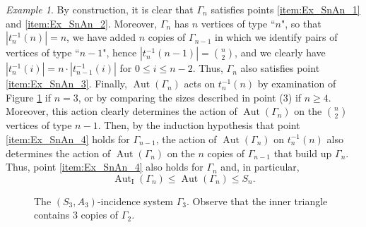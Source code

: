 \documentclass{amsart}
\theoremstyle{definition}
\theoremstyle{remark}
\newtheorem{example}[theorem]{Example}
\newcommand{\Aut}{\operatorname{Aut}}
\newcommand{\AutI}{\Aut_{\text{I}}}
\begin{document}
\begin{example}
By construction, it is clear that $\Gamma_n$ satisfies points \ref{item:Ex_SnAn_1} and  \ref{item:Ex_SnAn_2}. Moreover, $\Gamma_n$ has $n$ vertices of type ``$n$", so that $|t_n^{-1}(n)| = n$, we have added $n$ copies of $\Gamma_{n-1}$ in which we identify pairs of vertices of type ``$n-1$", hence $|t_n^{-1}(n-1)| = \binom{n}{2}$, and we clearly have $|t_n^{-1}(i)| = n \cdot |t_{n-1}^{-1}(i)|$ for $0\leq i \leq  n - 2$. Thus, $\Gamma_n$ also satisfies point \ref{item:Ex_SnAn_3}. Finally, $\Aut(\Gamma_n)$ acts on $t_n^{-1}(n)$ by examination of Figure \ref{fig:Gamma_3} if $n=3$, or by comparing the sizes described in point (3) if $n\geq 4$. Moreover, this action clearly determines the action of $\Aut(\Gamma_n)$ on the $\binom{n}{2}$ vertices of type $n-1$.  Then, by the induction hypothesis that point \ref{item:Ex_SnAn_4} holds for $\Gamma_{n-1}$, the action of $\Aut(\Gamma_n)$ on $t_n^{-1}(n)$ also determines the action of $\Aut(\Gamma_n)$ on the $n$ copies of $\Gamma_{n-1}$ that build up $\Gamma_n$. Thus, point \ref{item:Ex_SnAn_4} also holds for $\Gamma_n$ and, in particular, 
\[
\AutI(\Gamma_n)\leq\Aut(\Gamma_n)\leq S_n.
\]


\begin{figure}[ht]
    \centering
{}
\caption{The $(S_3,A_3)$-incidence system $\Gamma_3$. Observe that the inner triangle contains $3$ copies of $\Gamma_2$.}\label{fig:Gamma_3}
\end{figure}


\end{example}
\end{document}
